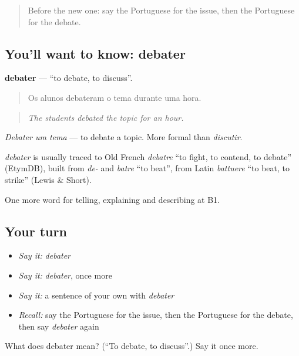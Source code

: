 \begin{quote}
Before the new one: say the Portuguese for the issue, then the Portuguese for the debate.
\end{quote}

\subsection*{You'll want to know: debater}
\textbf{debater} — \textquotedblleft{}to debate, to discuss\textquotedblright{}.

\begin{quote}
Os alunos debateram o tema durante uma hora.
\end{quote}

\begin{quote}
\emph{The students debated the topic for an hour.}
\end{quote}

\emph{Debater um tema} — to debate a topic. More formal than \emph{discutir}.

\begin{cousinweb}
\emph{debater} is usually traced to Old French \emph{debatre} \textquotedblleft{}to fight, to contend, to debate\textquotedblright{} (EtymDB), built from \emph{de-} and \emph{batre} \textquotedblleft{}to beat\textquotedblright{}, from Latin \emph{battuere} \textquotedblleft{}to beat, to strike\textquotedblright{} (Lewis \& Short).
\end{cousinweb}

\begin{grammarlens}[title={What you've built}]
One more word for telling, explaining and describing at B1.
\end{grammarlens}

\subsection*{Your turn}
\begin{itemize}
\raggedright
  \item \emph{Say it:} \emph{debater}
  \item \emph{Say it:} \emph{debater}, once more
  \item \emph{Say it:} a sentence of your own with \emph{debater}
  \item \emph{Recall:} say the Portuguese for the issue, then the Portuguese for the debate, then say \emph{debater} again
\end{itemize}

\begin{tcolorbox}[breakable,colback=teal!4,colframe=teal!35!black,title={Before you move on}]
What does debater mean? (\textquotedblleft{}To debate, to discuss\textquotedblright{}.) Say it once more.
\end{tcolorbox}
